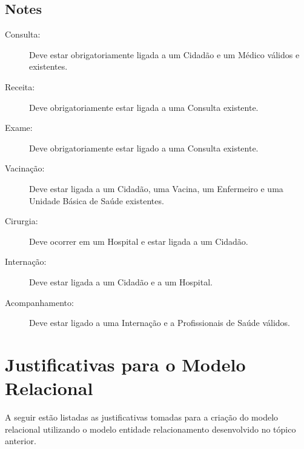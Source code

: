 \documentclass[12pt, a4paper]{article}
\begin{document}


\subsection{Notes}
\begin{description}
    \item[Consulta:] Deve estar obrigatoriamente ligada a um Cidadão e um Médico válidos e existentes.
    
    \item[Receita:] Deve obrigatoriamente estar ligada a uma Consulta existente.
    
    \item[Exame:] Deve obrigatoriamente estar ligado a uma Consulta existente.
    
    \item[Vacinação:] Deve estar ligada a um Cidadão, uma Vacina, um Enfermeiro e uma Unidade Básica de Saúde existentes.
    
    \item[Cirurgia:] Deve ocorrer em um Hospital e estar ligada a um Cidadão.
    
    \item[Internação:] Deve estar ligada a um Cidadão e a um Hospital.
    
    \item[Acompanhamento:] Deve estar ligado a uma Internação e a Profissionais de Saúde válidos.
\end{description}

\section{Justificativas para o Modelo Relacional}
A seguir estão listadas as justificativas tomadas para a criação do modelo
relacional utilizando o modelo entidade relacionamento desenvolvido no tópico anterior.
\end{document}
